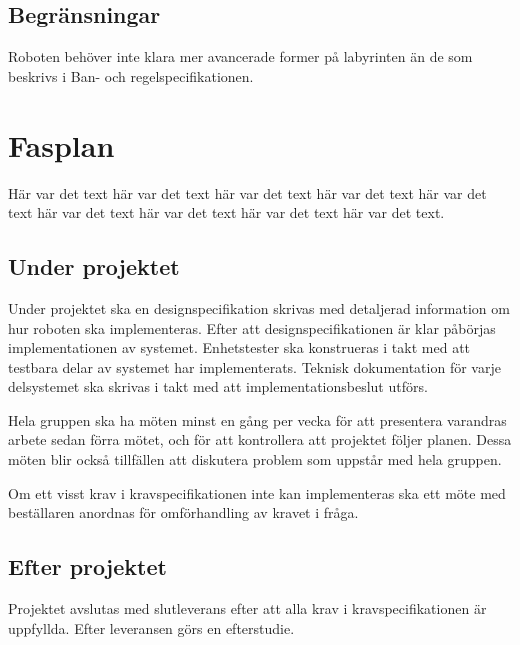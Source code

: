 \documentclass[a4paper,titlepage,12pt]{article}
\begin{document}
	
	\subsection{Begränsningar}
	Roboten behöver inte klara mer avancerade former på labyrinten än de som
    beskrivs i Ban- och regelspecifikationen.
	
	
	\section{Fasplan}
	Här var det text här var det text här var det text
	här var det text här var det text här var det text
	här var det text här var det text här var det text.
	
	
	
	\subsection{Under projektet}
	Under projektet ska en designspecifikation skrivas med detaljerad
    information om hur roboten ska implementeras. Efter att
    designspecifikationen är klar påbörjas implementationen av systemet.
    Enhetstester ska konstrueras i takt med att testbara delar av systemet har
    implementerats. Teknisk dokumentation för varje delsystemet ska skrivas
    i takt med att implementationsbeslut utförs.

    Hela gruppen ska ha möten minst en gång per vecka för att presentera
    varandras arbete sedan förra mötet, och för att kontrollera att projektet
    följer planen. Dessa möten blir också tillfällen att diskutera problem som
    uppstår med hela gruppen.

    Om ett visst krav i kravspecifikationen inte kan implementeras ska ett möte
    med beställaren anordnas för omförhandling av kravet i fråga.
	
	\subsection{Efter projektet}
    Projektet avslutas med slutleverans efter att alla krav i
    kravspecifikationen är uppfyllda. Efter leveransen görs en efterstudie.
	
\end{document}
